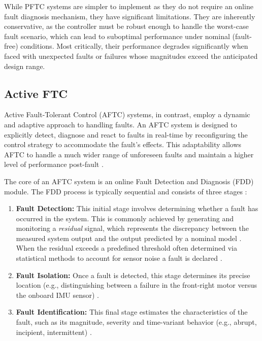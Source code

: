 While PFTC systems are simpler to implement as they do not require an online fault diagnosis mechanism, they have significant limitations. They are inherently conservative, as the controller must be robust enough to handle the worst-case fault scenario, which can lead to suboptimal performance under nominal (fault-free) conditions. Most critically, their performance degrades significantly when faced with unexpected faults or failures whose magnitudes exceed the anticipated design range.

\subsection{Active FTC}
Active Fault-Tolerant Control (AFTC) systems, in contrast, employ a dynamic and adaptive approach to handling faults. An AFTC system is designed to explicitly detect, diagnose and react to faults in real-time by reconfiguring the control strategy to accommodate the fault's effects. This adaptability allows AFTC to handle a much wider range of unforeseen faults and maintain a higher level of performance post-fault  \cite{active1,active2,active3,Active_Ref}.

The core of an AFTC system is an online Fault Detection and Diagnosis (FDD) module. The FDD process is typically sequential and consists of three stages  \cite{fdd1,fdd2}:

\begin{enumerate}
    \item \textbf{Fault Detection:} This initial stage involves determining whether a fault has occurred in the system. This is commonly achieved by generating and monitoring a \textit{residual} signal, which represents the discrepancy between the measured system output and the output predicted by a nominal model  \cite{Isermann2011, ftc_UAV_review2}. When the residual exceeds a predefined threshold often determined via statistical methods to account for sensor noise a fault is declared  \cite{active1}.
    
    \item \textbf{Fault Isolation:} Once a fault is detected, this stage determines its precise location (e.g., distinguishing between a failure in the front-right motor versus the onboard IMU sensor)  \cite{Scognamiglio2024}.
    
    \item \textbf{Fault Identification:} This final stage estimates the characteristics of the fault, such as its magnitude, severity and time-variant behavior (e.g., abrupt, incipient, intermittent)  \cite{Zhang2008, Liu2022, Passive_Ref}.
\end{enumerate}

